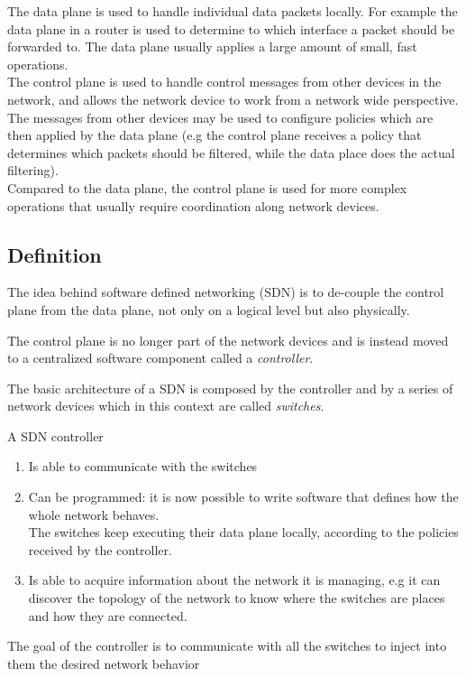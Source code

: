 The data plane is used to handle individual data packets locally.
For example the data plane in a router is used to determine to which interface a packet should be forwarded to.
The data plane usually applies a large amount of small, fast operations. \\
The control plane is used to handle control messages from other devices in the network, and allows the network device to work from a network wide perspective. \\
The messages from other devices may be  used to configure policies which are then applied by the data plane (e.g the control plane receives a policy that determines which packets should be filtered, while the data place does the actual filtering). \\
Compared to the data plane, the control plane is used for more complex operations that usually require coordination along network devices.



\subsection{Definition}
The idea behind software defined networking (SDN) is to de-couple the control plane from the data plane, not only on a logical level but also physically.

The control plane is no longer part of the network devices and is instead moved to a  centralized software component called a \textit{controller}.

The basic architecture of a SDN is composed by the controller and by a series of network devices which in this context are called \textit{switches}.


A SDN controller

\begin{enumerate}
	\item Is able to communicate with the switches
	\item Can be programmed: it is now possible to write software that defines how the whole network behaves. \\
	The switches keep executing their data plane locally, according to the policies received by the controller.
	\item Is able to acquire information about the network it is managing, e.g it can discover the topology of the network to know where the switches are places and how they are connected.
\end{enumerate}

The goal of the controller is to communicate with all the switches to inject into them the desired network behavior

